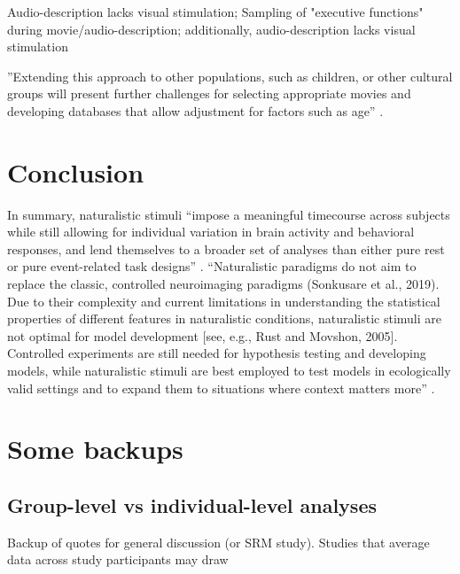 %
Audio-description lacks visual stimulation; Sampling of "executive functions"
during movie/audio-description;
%
additionally, audio-description lacks visual stimulation

%
''Extending this approach to other populations, such as children, or other
cultural groups will present further challenges for selecting appropriate movies
and developing databases that allow adjustment for factors such as age''
\citep{jiahui2020predicting}.




\section{Conclusion}





%
In summary, naturalistic stimuli ``impose a meaningful timecourse across
subjects while still allowing for individual variation in brain activity and
behavioral responses, and lend themselves to a broader set of analyses than
either pure rest or pure event-related task designs'' \citep{finn2017can}.
%
``Naturalistic paradigms do not aim to replace the classic, controlled
neuroimaging paradigms (Sonkusare et al., 2019). Due to their complexity and
current limitations in understanding the statistical properties of different
features in naturalistic conditions, naturalistic stimuli are not optimal for
model development [see, e.g., Rust and Movshon, 2005]. Controlled experiments
are still needed for hypothesis testing and developing models, while
naturalistic stimuli are best employed to test models in ecologically valid
settings and to expand them to situations where context matters
more'' \citep{saarimaki2021naturalistic}.




\section{Some backups}


\subsection{Group-level vs individual-level analyses}

Backup of quotes for general discussion (or SRM study).  Studies that average
data across study participants may draw


